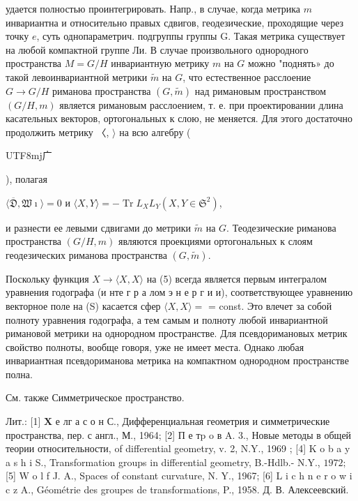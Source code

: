 \documentclass[10pt]{article}
\begin{document}
удается полностью проинтегрировать. Напр., в случае, когда метрика $m$ инвариантна и относительно правых сдвигов, геодезические, проходящие через точку $e$, суть однопараметрич. подгруппы группы G. Такая метрика существует на любой компактной группе Ли. В случае произвольного однородного пространства $M=G / H$ инвариантную метрику $m$ на $G$ можно "поднять» до такой левоинвариантной метрики $\tilde{m}$ на $G$, что естественное расслоение $G \rightarrow G / H$ риманова пространства $(G, \tilde{m})$ над римановым пространством $(G / H, m)$ является римановым расслоением, т. е. при проектировании длина касательных векторов, ортогональных к слою, не меняется. Для этого достаточно продолжить метрику 〈, $\rangle$ на всю алгебру (\begin{CJK}{UTF8}{mj}广\end{CJK}), полагая



$\langle\overline{\mathfrak{D}}, \mathfrak{W} \imath\rangle=0$ и $\langle X, Y\rangle=-\operatorname{Tr} L_{X} L_{Y}\left(X, Y \in \mathfrak{S}^{2}\right)$,



и разнести ее левыми сдвигами до метрики $\tilde{m}$ на $G$. Теодезические риманова пространства $(G / H, m)$ являются проекциями ортогональных к слоям геодезических риманова пространства $(G, \tilde{m})$.



Поскольку функция $X \rightarrow\langle X, X\rangle$ на (5) всегда является первым интегралом уравнения годографа (и нте г р а лом э н е р г и и), соответствующее уравнению векторное поле на (S) касается сфер $\langle X, X\rangle=$ = const. Это влечет за собой полноту уравнения годографа, а тем самым и полноту любой инвариантной римановой метрики на однородном пространстве. Для псевдоримановых метрик свойство полноты, вообще говоря, уже не имеет места. Однако любая инвариантная псевдориманова метрика на компактном однородном пространстве полна.



См. также Симметрическое пространство.



Лит.: [1] $\mathbf{X}$ е лг а с о н С., Дифференциальная геометрия и симметрические пространства, пер. с англ., М., 1964; [2] П е тp o в A. 3., Новые методы в общей теории относительности, of differential geometry, v. 2, N.Y., 1969 ; [4] K o b a y a s h i S., Transformation groups in differential geometry, B.-Hdlb.- N.Y., $1972 ;$ [5] W o l f J. A., Spaces of constant curvature, N. Y., 1967; [6] L i c h n e r o w i c z A., Géométrie des groupes de transformations, P., 1958. Д. В. Алексеевский.
\end{document}
